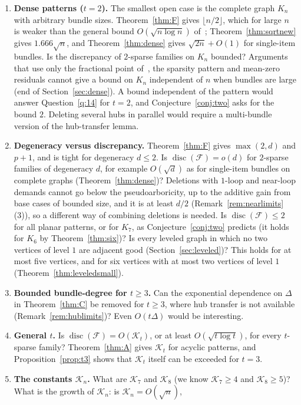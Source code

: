 \documentclass[11pt,letterpaper]{article}
\theoremstyle{definition}
\newcommand{\cF}{\mathcal{F}}
\DeclareMathOperator{\disc}{disc}
\begin{document}
\begin{enumerate}[leftmargin=*,itemsep=2pt]
\item \textbf{Dense patterns ($t=2$).} The smallest open case is the complete graph $K_n$ with
arbitrary bundle sizes. Theorem~\ref{thm:F} gives $\lfloor n/2\rfloor$, which for large $n$ is weaker than the
general bound $O(\sqrt{n\log n})$ of~\cite{HMMS25}; Theorem~\ref{thm:sqrtnew} gives $1.666\sqrt n$, and
Theorem~\ref{thm:dense} gives $\sqrt{2n}+O(1)$ for single-item bundles. Is the discrepancy of $2$-sparse
families on $K_n$ bounded? Arguments that use only the fractional point of~\cite{HMMS25}, the sparsity
pattern and mean-zero residuals cannot give a bound on $K_n$ independent of $n$ when bundles are large
(end of Section~\ref{sec:dense}). A bound independent of the pattern would answer Question~\ref{q:14} for $t=2$, and
Conjecture~\ref{conj:two} asks for the bound $2$. Deleting several hubs in parallel would require a
multi-bundle version of the hub-transfer lemma.
\item \textbf{Degeneracy versus discrepancy.} Theorem~\ref{thm:F} gives $\max(2,d)$ and $p+1$, and is
tight for degeneracy $d\le2$. Is $\disc(\cF)=o(d)$ for $2$-sparse families of degeneracy $d$, for
example $O(\sqrt d)$ as for single-item bundles on complete graphs (Theorem~\ref{thm:dense})? Deletions
with $1$-loop and near-loop demands cannot go below the pseudoarboricity, up to the additive gain from
base cases of bounded size, and it is at least $d/2$
(Remark~\ref{rem:nearlimits}(3)), so a different way of combining deletions is needed. Is
$\disc(\cF)\le2$ for all planar patterns, or for $K_7$, as Conjecture~\ref{conj:two} predicts (it holds for
$K_6$ by Theorem~\ref{thm:six})? Is every leveled graph in which no two vertices of level $1$ are adjacent
good (Section~\ref{sec:leveled})? This holds for at most five vertices, and for six vertices with at most
two vertices of level $1$ (Theorem~\ref{thm:leveledsmall}).
\item \textbf{Bounded bundle-degree for $t\ge3$.} Can the exponential dependence on $\Delta$ in
Theorem~\ref{thm:C} be removed for $t\ge3$, where hub transfer is not available
(Remark~\ref{rem:hublimits})? Even $O(t\Delta)$ would be interesting.
\item \textbf{General $t$.} Is $\disc(\cF)=O(\mathcal{K}_t)$, or at least $O(\sqrt{t\log t})$, for every
$t$-sparse family? Theorem~\ref{thm:A} gives $\mathcal{K}_t$ for acyclic patterns, and
Proposition~\ref{prop:t3} shows that $\mathcal{K}_t$ itself can be exceeded for $t=3$.
\item \textbf{The constants $\mathcal{K}_n$.} What are $\mathcal{K}_7$ and $\mathcal{K}_8$ (we know $\mathcal{K}_7\ge4$ and $\mathcal{K}_8\ge5$)? What is the growth of $\mathcal{K}_n$: is $\mathcal{K}_n=O(\sqrt n)$,

\end{enumerate}
\end{document}
